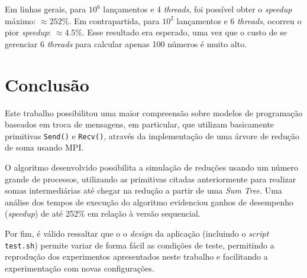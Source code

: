 \documentclass[12pt,a4paper]{article}
\begin{document}
Em linhas gerais, para $10^{6}$ lançamentos e 4 \textit{threads}, foi possível
obter o \textit{speedup} máximo: $\approx 252\%$. Em contrapartida, para
$10^{2}$ lançamentos e 6 \textit{threads}, ocorreu o pior \textit{speedup}:
$\approx 4.5\%$. Esse resultado era esperado, uma vez que o custo de se
gerenciar 6 \textit{threads} para calcular apenas 100 números é muito alto.



\section{Conclusão}
Este trabalho possibilitou uma maior compreensão sobre modelos de programação
baseados em troca de mensagens, em particular, que utilizam basicamente
primitivas \texttt{Send()} e \texttt{Recv()}, através da implementação de uma
árvore de redução de soma usando MPI\@.

O algoritmo desenvolvido possibilita a simulação de reduções usando um número
grande de processos, utilizando as primitivas citadas anteriormente para
realizar somas intermediárias até chegar na redução a partir de uma \emph{Sum
Tree}. Uma análise dos tempos de execução do algoritmo evidenciou ganhos de
desempenho (\textit{speedup}) de até 252\% em relação à versão sequencial.

Por fim, é válido ressaltar que o o \textit{design} da aplicação (incluindo o
\textit{script} \texttt{test.sh}) permite variar de forma fácil as condições de
teste, permitindo a reprodução dos experimentos apresentados neste trabalho e
facilitando a experimentação com novas configurações. 



\end{document}
